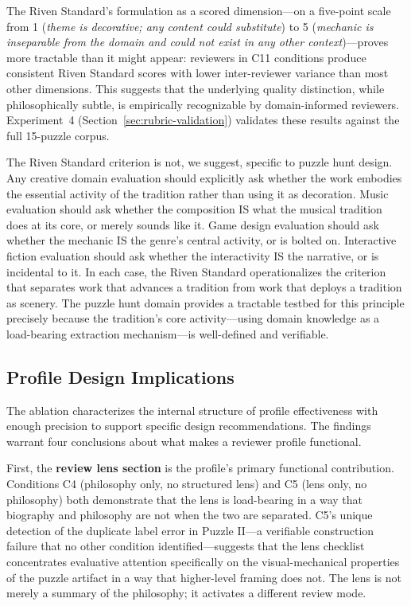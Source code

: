 The Riven Standard's formulation as a scored dimension---on a five-point scale from 1
(\emph{theme is decorative; any content could substitute}) to 5 (\emph{mechanic is
inseparable from the domain and could not exist in any other context})---proves more tractable
than it might appear: reviewers in C11 conditions produce consistent Riven Standard scores
with lower inter-reviewer variance than most other dimensions. This suggests that the
underlying quality distinction, while philosophically subtle, is empirically recognizable by
domain-informed reviewers. Experiment~4 (Section~\ref{sec:rubric-validation}) validates these
results against the full 15-puzzle corpus.

The Riven Standard criterion is not, we suggest, specific to puzzle hunt design. Any creative
domain evaluation should explicitly ask whether the work embodies the essential activity of
the tradition rather than using it as decoration. Music evaluation should ask whether the
composition IS what the musical tradition does at its core, or merely sounds like it. Game
design evaluation should ask whether the mechanic IS the genre's central activity, or is
bolted on. Interactive fiction evaluation should ask whether the interactivity IS the
narrative, or is incidental to it. In each case, the Riven Standard operationalizes the
criterion that separates work that advances a tradition from work that deploys a tradition
as scenery. The puzzle hunt domain provides a tractable testbed for this principle precisely
because the tradition's core activity---using domain knowledge as a load-bearing extraction
mechanism---is well-defined and verifiable.

\subsection{Profile Design Implications}
\label{sec:profile-implications}

The ablation characterizes the internal structure of profile effectiveness with enough
precision to support specific design recommendations. The findings warrant four conclusions
about what makes a reviewer profile functional.

First, the \textbf{review lens section} is the profile's primary functional contribution.
Conditions C4 (philosophy only, no structured lens) and C5 (lens only, no philosophy) both
demonstrate that the lens is load-bearing in a way that biography and philosophy are not when
the two are separated. C5's unique detection of the duplicate label error in Puzzle II---a
verifiable construction failure that no other condition identified---suggests that the lens
checklist concentrates evaluative attention specifically on the visual-mechanical properties
of the puzzle artifact in a way that higher-level framing does not. The lens is not merely a
summary of the philosophy; it activates a different review mode.

